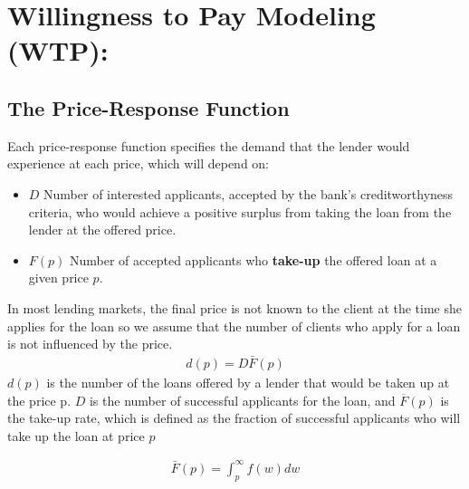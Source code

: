 
\chapter{Willingness to Pay Modeling (WTP): }
\section{The Price-Response Function}
Each price-response function specifies the demand that the lender would experience at each price, which will depend on:
\begin{itemize}
    \item $D$ Number of interested applicants, accepted by the bank's creditworthyness criteria, who would achieve a positive surplus from taking the loan from the lender at the offered price.
    \item $F(p)$ Number of accepted applicants who \textbf{take-up} the offered loan at a given price $p$.
\end{itemize}
In most lending markets, the final price is not known to the client at the time she applies for the loan so we assume that the number of clients who apply for a loan is not influenced by the price.
\begin{align}
d(p)=D\bar{F}(p) \label{eq:demand}
\end{align}
$d(p)$ is the number of the loans offered by a lender that would be taken up at the price p. $D$ is the number of successful applicants for the loan, and $\overline{F}(p)$ is the take-up rate, which is defined as the fraction of successful applicants who will take up the loan at price $p$

\begin{align}
\bar{F}(p)=\int^\infty_p f(w)dw
\end{align}
